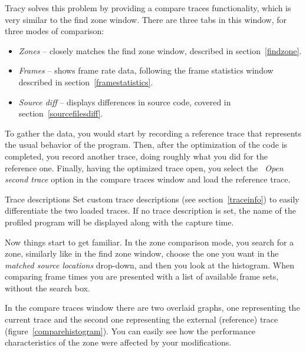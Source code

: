 \documentclass[hidelinks,titlepage,a4paper,twoside]{article}
\begin{document}
Tracy solves this problem by providing a compare traces functionality, which is very similar to the find zone window. There are three tabs in this window, for three modes of comparison:

\begin{itemize}
\item \emph{Zones} -- closely matches the find zone window, described in section~\ref{findzone}.
\item \emph{Frames} -- shows frame rate data, following the frame statistics window described in section~\ref{framestatistics}.
\item \emph{Source diff} -- displays differences in source code, covered in section~\ref{sourcefilesdiff}.
\end{itemize}

To gather the data, you would start by recording a reference trace that represents the usual behavior of the program. Then, after the optimization of the code is completed, you record another trace, doing roughly what you did for the reference one. Finally, having the optimized trace open, you select the \emph{\faFolderOpen{}~Open second trace} option in the compare traces window and load the reference trace.

\begin{bclogo}[
noborder=true,
couleur=black!5,
logo=\bclampe
]{Trace descriptions}
Set custom trace descriptions (see section~\ref{traceinfo}) to easily differentiate the two loaded traces. If no trace description is set, the name of the profiled program will be displayed along with the capture time.
\end{bclogo}

Now things start to get familiar. In the zone comparison mode, you search for a zone, similarly like in the find zone window, choose the one you want in the \emph{matched source locations} drop-down, and then you look at the histogram. When comparing frame times you are presented with a list of available frame sets, without the search box.

In the compare traces window there are two overlaid graphs, one representing the current trace and the second one representing the external (reference) trace (figure~\ref{comparehistogram}). You can easily see how the performance characteristics of the zone were affected by your modifications.
\end{document}

